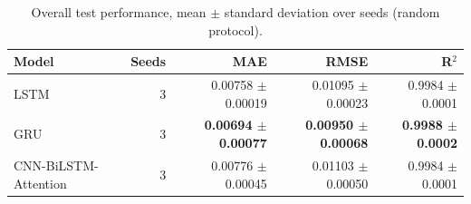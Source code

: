 \begin{table}[t]
\centering
\caption{Overall test performance, mean $\pm$ standard deviation over seeds (random protocol).}
\label{tab:overall_seeds_random}
\begin{tabular}{lrrrr}
\toprule
Model & Seeds & MAE & RMSE & R$^2$ \\
\midrule
LSTM & 3 & 0.00758 $\pm$ 0.00019 & 0.01095 $\pm$ 0.00023 & 0.9984 $\pm$ 0.0001 \\
GRU & 3 & \textbf{0.00694 $\pm$ 0.00077} & \textbf{0.00950 $\pm$ 0.00068} & \textbf{0.9988 $\pm$ 0.0002} \\
CNN-BiLSTM-Attention & 3 & 0.00776 $\pm$ 0.00045 & 0.01103 $\pm$ 0.00050 & 0.9984 $\pm$ 0.0001 \\
\bottomrule
\end{tabular}
\end{table}